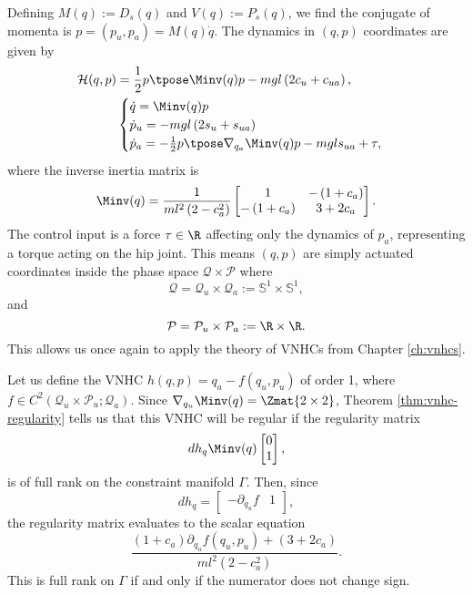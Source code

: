 Defining \(M(q) := D_s(q)\) and \(V(q) := P_s(q)\), we find the conjugate of momenta 
is \(p = (p_u, p_a) = M(q)\dot{q}\).
The dynamics in \((q,p)\) coordinates are given by
\begin{align}\label{eqn:acrobot-hamiltonian}
    \mathcal{H}(q,p) &= \frac{1}{2}p\tpose \Minv(q) p -
    mgl\left(2 c_u + c_{ua}\right)
    , \\
     &\begin{cases}
        \dot{q} = \Minv(q) p \\
        \dot{p}_u = -mgl\left(2s_u + s_{ua}\right) \\
        \dot{p}_a =-\frac{1}{2}p\tpose \nabla_{q_a}\Minv(q) p
        - mgl s_{ua} + \tau,
    \end{cases} \nonumber
\end{align}
where the inverse inertia matrix is
\begin{equation}\label{eqn:Minv}
    \Minv(q) = \frac{1}{ml^2\left(2-c_a^2\right)}
    \begin{bmatrix}
        1 &
        -\left(1+c_a\right) \\
        -\left(1+c_a\right) &
        3+2c_a
    \end{bmatrix}
    .
\end{equation}
The control input is a force \(\tau \in \R\) affecting only the dynamics of
\(p_a\), representing a torque acting on the hip joint.
This means \((q,p)\) are simply actuated coordinates inside the phase space
\(\mathcal{Q} \times \mathcal{P}\) where
\[
    \mathcal{Q} = \mathcal{Q}_u \times \mathcal{Q}_a := 
    \mathbb{S}^1 \times \mathbb{S}^1
    ,
\]
and
\[
    \mathcal{P} = \mathcal{P}_u \times \mathcal{P}_a
    := \R \times \R
    .
\]
This allows us once again to apply the theory of VNHCs from Chapter
\ref{ch:vnhcs}.

Let us define the VNHC \(h(q,p) = q_a - f(q_u,p_u)\) of order 1, where
\(f \in C^2\left(\mathcal{Q}_u \times \mathcal{P}_u; \mathcal{Q}_a\right)\).
Since \(\nabla_{q_u}\Minv(q) = \Zmat{2\times 2}\),
Theorem \ref{thm:vnhc-regularity} tells us that this VNHC will be regular
if the regularity matrix
\[
    dh_q \Minv(q) \begin{bmatrix}0 \\ 1 \end{bmatrix}
    ,
\]
is of full rank on the constraint manifold \(\Gamma\).
Then, since 
\[
    dh_q = \begin{bmatrix}
        -\partial_{q_u} f & 1
    \end{bmatrix}
    ,
\]
the regularity matrix evaluates to the scalar equation
\begin{equation}\label{eqn:regularity-matrix-acrobot}
    \frac{(1+c_a)\partial_{q_u}f(q_u,p_u) + (3+2c_a)}{ml^2(2-c_a^2)}
    .
\end{equation}
This is full rank on \(\Gamma\) if and only if the numerator does not
change sign.

